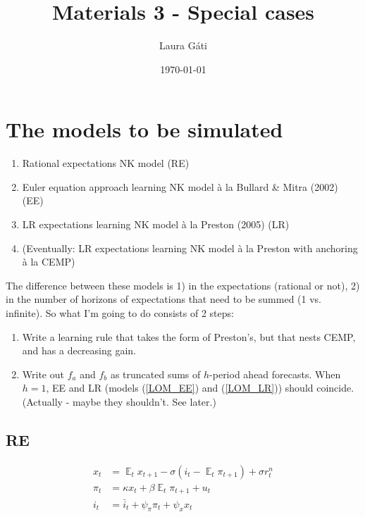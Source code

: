 \documentclass[11pt]{article}
\renewcommand{\[}{\begin{equation}}
\renewcommand{\]}{\end{equation}}
\DeclareMathOperator{\E}{\mathbb{E}}
\begin{document}
\linespread{1.0}

\title{Materials 3 - Special cases}
\author{Laura G\'ati} 
\date{\today}
\maketitle


\tableofcontents


\newpage
\section{The models to be simulated}
\begin{enumerate}
\item Rational expectations NK model (RE)
\item Euler equation approach learning NK model \`a la Bullard \& Mitra (2002)  (EE)
\item LR expectations learning NK model \`a la Preston (2005)  (LR)
\item (Eventually: LR expectations learning NK model \`a la Preston with anchoring \`a la CEMP)
\end{enumerate}

The difference between these models is 1) in the expectations (rational or not), 2) in the number of horizons of expectations that need to be summed (1 vs. infinite). So what I'm going to do consists of 2 steps: 
\begin{enumerate}
\item Write a learning rule that takes the form of Preston's, but that nests CEMP, and has a decreasing gain.
\item Write out $f_a$ and $f_b$ as truncated sums of $h$-period ahead forecasts. When $h=1$, EE and LR (models (\ref{LOM_EE}) and (\ref{LOM_LR})) should coincide. (Actually - maybe they shouldn't. See later.)
\end{enumerate}

\subsection{RE}
\begin{align}
x_t &= \E_t x_{t+1} - \sigma(i_t - \E_t \pi_{t+1}) +\sigma r_t^n \label{NKIS} \\
\pi_t &= \kappa x_t +\beta \E_t \pi_{t+1} + u_t  \label{NKPC} \\
i_t &= \bar{i}_t + \psi_{\pi}\pi_t + \psi_{x} x_t  \label{TR}
\end{align}
\end{document}
